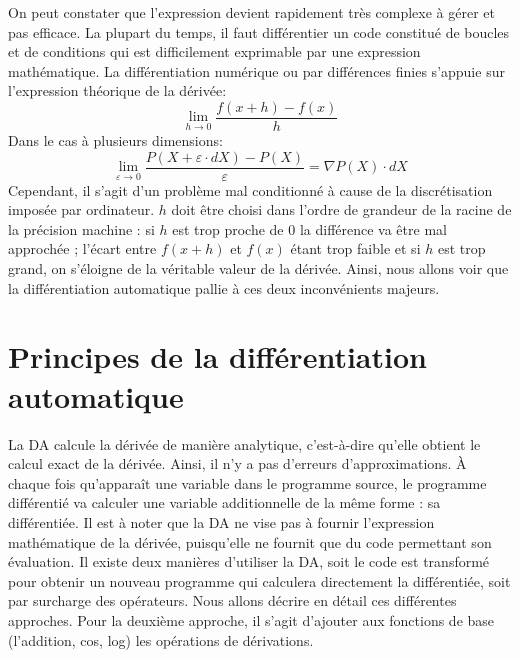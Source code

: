 On peut constater que l'expression devient rapidement tr\`es complexe \`a g\'erer et pas efficace.
La  plupart du temps, il faut diff\'erentier un code constitu\'e de
boucles et de conditions qui est difficilement exprimable par une expression
math\'ematique. La diff\'erentiation num\'erique ou par diff\'erences finies
s'appuie sur l'expression th\'eorique de la d\'eriv\'ee: 
$$\lim_{h\rightarrow 0}\frac{f(x+h)-f(x)}{h}$$
Dans le cas \`a plusieurs dimensions:
$$\lim_{\varepsilon \rightarrow 0}\frac{P(X+\varepsilon \cdot dX)-P(X)}{\varepsilon} =
 \nabla P(X)\cdot dX$$
Cependant, il s'agit d'un probl\`eme mal conditionn\'e \`a cause de la
discr\'etisation impos\'ee par ordinateur. $h$ doit être choisi dans l'ordre de
 grandeur de la racine de la pr\'ecision machine : si $h$ est trop proche de $0$ la
diff\'erence va être mal approch\'ee ; l'\'ecart entre $f(x+h)$ et $f(x)$
 \'etant trop faible et si $h$ est trop grand, on s'\'eloigne de la v\'eritable
valeur de la d\'eriv\'ee. Ainsi, nous allons voir que la diff\'erentiation
automatique pallie \`a ces deux inconv\'enients majeurs. \\






\section{Principes de la diff\'erentiation automatique}
\label{sec:da}



La DA calcule la d\'eriv\'ee de mani\`ere analytique, c'est-\`a-dire qu'elle obtient le calcul exact de la d\'eriv\'ee. Ainsi, il n'y a pas d'erreurs
d'approximations. \`A chaque fois qu'appara\^it une variable dans le programme source,
le programme diff\'erenti\'e va calculer une variable additionnelle de la même forme : sa diff\'erenti\'ee.
Il est \`a noter que la DA ne vise pas \`a fournir l'expression math\'ematique de la d\'eriv\'ee, puisqu'elle ne fournit que du
code permettant son \'evaluation.
Il existe deux mani\`eres d'utiliser la DA, soit le code est transform\'e pour obtenir un nouveau programme qui
calculera directement la diff\'erenti\'ee, soit par surcharge des op\'erateurs. Nous allons d\'ecrire en d\'etail ces diff\'erentes approches.
Pour la deuxi\`eme approche, il s'agit d'ajouter aux fonctions de base (l'addition, cos, log) les op\'erations de d\'erivations.




